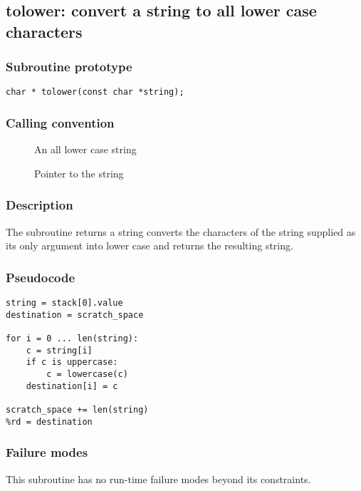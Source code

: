 \clearpage
{}
{}
\label{subr:tolower}
\subsection*{tolower: convert a string to all lower case characters}

\subsubsection*{Subroutine prototype}

\begin{verbatim}
char * tolower(const char *string);
\end{verbatim}

\subsubsection*{Calling convention}

\begin{description}
\item[] An all lower case string
\item[] Pointer to the string
\end{description}

\subsubsection*{Description}

The  subroutine returns a string converts the
characters of the string supplied as its only argument into lower case
and returns the resulting string.

\subsubsection*{Pseudocode}

\begin{verbatim}
string = stack[0].value
destination = scratch_space

for i = 0 ... len(string):
    c = string[i]
    if c is uppercase:
        c = lowercase(c)
    destination[i] = c

scratch_space += len(string)
%rd = destination
\end{verbatim}

\subsubsection*{Failure modes}

This subroutine has no run-time failure modes beyond its constraints.
